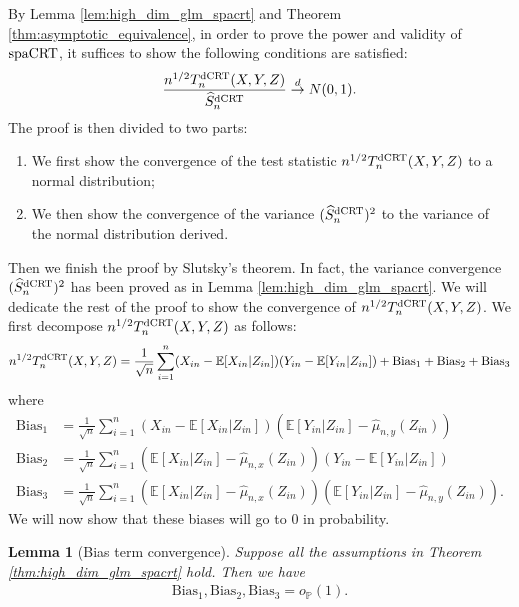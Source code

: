 \documentclass[12pt]{article}
\newtheorem{lemma}{Lemma}
\theoremstyle{definition}
\def\P{\mathbb{P}}
\def\P{\mathbb{P}}
\newcommand{\E}{\mathbb E}								%
\renewcommand{\P}{\mathbb{P}}							%
\newcommand{\srx}{X}									%
\newcommand{\srz}{Z}									%
\newcommand{\sry}{Y}									%
\newcommand{\dCRT}{\textnormal{dCRT}} 					%
\newcommand{\spacrt}{\textnormal{spaCRT}}               %
\begin{document}
By Lemma \ref{lem:high_dim_glm_spacrt} and Theorem \ref{thm:asymptotic_equivalence}, in order to prove the power and validity of $\spacrt$, it suffices to show the following conditions are satisfied:
\begin{align*}
  \frac{n^{1/2}T_n^{\dCRT}(\srx,\sry,\srz)}{\widehat{S}_n^{\dCRT}}\overset{d}{\rightarrow}N(0,1).
\end{align*}
The proof is then divided to two parts: 
\begin{enumerate}
  \item We first show the convergence of the test statistic $n^{1/2}T_n^{\dCRT}(\srx,\sry,\srz)$ to a normal distribution; 
  \item We then show the convergence of the variance $(\widehat{S}_n^{\dCRT})^2$ to the variance of the normal distribution derived.
\end{enumerate}
Then we finish the proof by Slutsky's theorem. In fact, the variance convergence $(\widehat{S}_n^{\dCRT})^2$ has been proved as in Lemma \ref{lem:high_dim_glm_spacrt}. We will dedicate the rest of the proof to show the convergence of $n^{1/2}T_n^{\dCRT}(\srx,\sry,\srz)$. We first decompose $n^{1/2}T_n^{\dCRT}(\srx,\sry,\srz)$ as follows:
\begin{align*}
  n^{1/2}T_n^{\dCRT}(\srx,\sry,\srz)=\frac{1}{\sqrt{n}}\sum_{i=1}^n (\srx_{in}-\E[\srx_{in}|\srz_{in}])(\sry_{in}-\E[\sry_{in}|\srz_{in}])+\mathrm{Bias}_{1}+\mathrm{Bias}_{2}+\mathrm{Bias}_{3}
\end{align*}
where 
\begin{align*}
  \mathrm{Bias}_1
  &
  =\frac{1}{\sqrt{n}}\sum_{i=1}^n (\srx_{in}-\E[\srx_{in}|\srz_{in}])(\E[\sry_{in}|\srz_{in}]-\widehat{\mu}_{n,y}(\srz_{in}))\\
  \mathrm{Bias}_2
  &
  =\frac{1}{\sqrt{n}}\sum_{i=1}^n (\E[\srx_{in}|\srz_{in}]-\widehat{\mu}_{n,x}(\srz_{in}))(\sry_{in}-\E[\sry_{in}|\srz_{in}])\\
  \mathrm{Bias}_3
  &
  =\frac{1}{\sqrt{n}}\sum_{i=1}^n (\E[\srx_{in}|\srz_{in}]-\widehat{\mu}_{n,x}(\srz_{in}))(\E[\sry_{in}|\srz_{in}]-\widehat{\mu}_{n,y}(\srz_{in})).
\end{align*}
We will now show that these biases will go to $0$ in probability. 
\begin{lemma}[Bias term convergence]\label{lem:lasso_bias_convergence}
  Suppose all the assumptions in Theorem \ref{thm:high_dim_glm_spacrt} hold. Then we have 
  \begin{align*}
    \mathrm{Bias}_1,\mathrm{Bias}_2,\mathrm{Bias}_3=o_{\P}(1).
  \end{align*}
\end{lemma}
\end{document}
